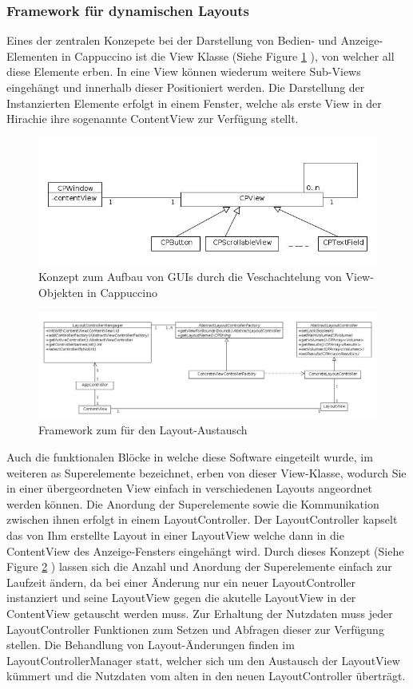 \subsubsection{Framework für dynamischen Layouts}
\label{sec:Umsetzung der dynamischen Layouts}
Eines der zentralen Konzepete bei der Darstellung von Bedien- und Anzeige-Elementen in Cappuccino ist die View Klasse (Siehe Figure \ref{fig:cappuccino_view_concept} ), 
von welcher all diese Elemente erben.
In eine View können wiederum weitere Sub-Views eingehängt und innerhalb dieser Positioniert werden.
Die Darstellung der Instanzierten Elemente erfolgt in einem Fenster, welche als erste View in der Hirachie ihre sogenannte ContentView zur Verfügung stellt.
\begin{figure}[t]
	\centering
	\includegraphics[width=0.6\linewidth]{img/c3_cappuccino_view_concept.jpg}
	\caption{Konzept zum Aufbau von GUIs durch die Veschachtelung von View-Objekten in Cappuccino}
	\label{fig:cappuccino_view_concept}
\end{figure}
\begin{figure}[t]
	\centering
	\includegraphics[width=\linewidth]{img/s3_layoutController_framework.jpg}
	\caption{Framework zum für den Layout-Austausch}
	\label{fig:layout_framework}
\end{figure}

Auch die funktionalen Blöcke in welche diese Software eingeteilt wurde, 
im weiteren as Superelemente bezeichnet, 
erben von dieser View-Klasse, 
wodurch Sie in einer übergeordneten View einfach in verschiedenen Layouts angeordnet werden können.
Die Anordung der Superelemente sowie die Kommunikation zwischen ihnen erfolgt in einem LayoutController.
Der LayoutController kapselt das von Ihm erstellte Layout in einer LayoutView welche dann in die ContentView des Anzeige-Fensters eingehängt wird.
Durch dieses Konzept (Siehe Figure \ref{fig:layout_framework} ) lassen sich die Anzahl und Anordung der Superelemente einfach zur Laufzeit ändern,
da bei einer Änderung nur ein neuer LayoutController instanziert und seine LayoutView gegen die akutelle LayoutView in der ContentView getauscht werden muss.
Zur Erhaltung der Nutzdaten muss jeder LayoutController Funktionen zum Setzen und Abfragen dieser zur Verfügung stellen.
Die Behandlung von Layout-Änderungen finden im LayoutControllerManager statt, 
welcher sich um den Austausch der LayoutView kümmert und die Nutzdaten vom alten in den neuen LayoutController überträgt.

